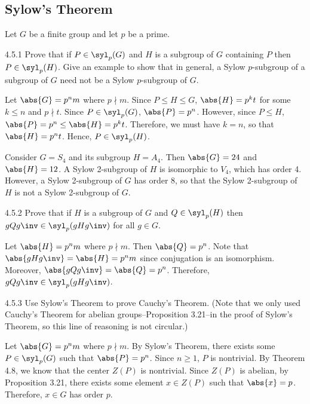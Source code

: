 \subsection{Sylow's Theorem}

Let $G$ be a finite group and let $p$ be a prime.

\begin{exercise}{4.5.1}
	Prove that if $P \in \syl_p(G)$ and $H$ is a subgroup of $G$ containing $P$ then $P \in \syl_p(H)$.
	Give an example to show that in general, a Sylow $p$-subgroup of a subgroup of $G$ need not be a Sylow $p$-subgroup of $G$.
\end{exercise}

\begin{sol}
	Let $\abs{G} = p^n m$ where $p \nmid m$.
	Since $P \leq H \leq G$, $\abs{H} = p^k t$ for some $k \leq n$ and $p \nmid t$.
	Since $P \in \syl_p(G)$, $\abs{P} = p^n$.
	However, since $P \leq H$, $\abs{P} = p^n \leq \abs{H} = p^k t$.
	Therefore, we must have $k = n$, so that $\abs{H} = p^n t$.
	Hence, $P \in \syl_p(H)$.

	Consider $G = S_4$ and its subgroup $H = A_4$.
	Then $\abs{G} = 24$ and $\abs{H} = 12$.
	A Sylow 2-subgroup of $H$ is isomorphic to $V_4$, which has order 4.
	However, a Sylow 2-subgroup of $G$ has order 8, so that the Sylow 2-subgroup of $H$ is not a Sylow 2-subgroup of $G$.
\end{sol}

\begin{exercise}{4.5.2}
	Prove that if $H$ is a subgroup of $G$ and $Q \in \syl_p(H)$ then $gQg\inv \in \syl_p(gHg\inv)$ for all $g \in G$.
\end{exercise}

\begin{sol}
	Let $\abs{H} = p^n m$ where $p \nmid m$.
	Then $\abs{Q} = p^n$.
	Note that $\abs{gHg\inv} = \abs{H} = p^n m$ since conjugation is an isomorphism.
	Moreover, $\abs{gQg\inv} = \abs{Q} = p^n$.
	Therefore, $gQg\inv \in \syl_p(gHg\inv)$.
\end{sol}

\begin{exercise}{4.5.3}
	Use Sylow's Theorem to prove Cauchy's Theorem. (Note that we only used Cauchy's Theorem for abelian groups--Proposition 3.21--in the proof of Sylow's Theorem, so this line of reasoning is not circular.)
\end{exercise}

\begin{sol}
	Let $\abs{G} = p^n m$ where $p \nmid m$.
	By Sylow's Theorem, there exists some $P \in \syl_p(G)$ such that $\abs{P} = p^n$.
	Since $n \geq 1$, $P$ is nontrivial.
	By Theorem 4.8, we know that the center $Z(P)$ is nontrivial.
	Since $Z(P)$ is abelian, by Proposition 3.21, there exists some element $x \in Z(P)$ such that $\abs{x} = p$.
	Therefore, $x \in G$ has order $p$.
\end{sol}

